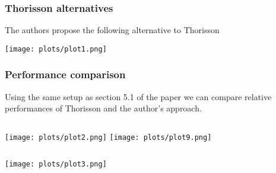 \documentclass{beamer}
\begin{document}
\begin{frame}
\frametitle{Thorisson alternatives}
The authors propose the following alternative to Thorisson
\vspace*{-0.1cm}
\end{frame}
\begin{frame}
\phantom{t}
\begin{center}
\texttt{[image: plots/plot1.png]}
\end{center}
\end{frame}
\begin{frame}
\frametitle{Performance comparison}
Using the same setup as section 5.1 of the paper we can compare relative performances of Thorisson and the author's approach.
\vspace*{0.5cm}
\begin{columns}[onlytextwidth, t] %
            \texttt{[image: plots/plot2.png]}
            \texttt{[image: plots/plot9.png]}
\end{columns} 
\end{frame}

\begin{frame}
\phantom{t}
\begin{center}
\texttt{[image: plots/plot3.png]}
\end{center}
\end{frame}
\end{document}
